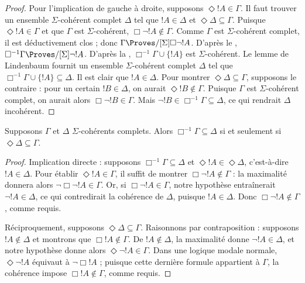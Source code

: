 \documentclass[../../../include/open-logic-section]{subfiles}
\begin{document}
{\begin{proof}
  Pour l'implication de gauche à droite, supposons $\Diamond !A \in
  \Gamma$. Il faut trouver un ensemble $\Sigma$-cohérent complet
  $\Delta$ tel que $!A \in \Delta$ et $\Diamond\Delta \subseteq \Gamma$.
  Puisque $\Diamond !A \in \Gamma$ et que $\Gamma$ est
  $\Sigma$-cohérent, $\Box\lnot !A \notin \Gamma$. Comme $\Gamma$ est
  $\Sigma$-cohérent complet, il est déductivement clos ; donc $\Gamma
  \Proves/[\Sigma] \Box\lnot !A$. D'après le ,
  $\Box^{-1}\Gamma \Proves/[\Sigma] \lnot !A$. D'après la
  ,
  $\Box^{-1}\Gamma \cup \{ !A \}$ est $\Sigma$-cohérent. Le lemme de
  Lindenbaum fournit un ensemble $\Sigma$-cohérent complet
  $\Delta$ tel que $\Box^{-1}\Gamma \cup \{ !A \} \subseteq
  \Delta$. Il est clair que $!A \in \Delta$. Pour montrer
  $\Diamond\Delta \subseteq \Gamma$, supposons le contraire : pour un
  certain $!B \in \Delta$, on aurait $\Diamond !B \notin \Gamma$.
  Puisque $\Gamma$ est $\Sigma$-cohérent complet, on aurait alors
  $\Box\lnot !B \in \Gamma$. Mais $\lnot
  !B \in \Box^{-1}\Gamma \subseteq \Delta$, ce qui rendrait $\Delta$
  incohérent.
\end{proof}
}

\begin{lem}
  Supposons $\Gamma$ et $\Delta$ $\Sigma$-cohérents complets. Alors
  $\Box^{-1}\Gamma \subseteq \Delta$ si et seulement si
  $\Diamond\Delta \subseteq \Gamma$.
\end{lem}

\begin{proof}
  Implication directe : supposons $\Box^{-1}\Gamma \subseteq \Delta$
  et $\Diamond!A \in \Diamond\Delta$, c'est-à-dire $!A \in \Delta$.
  Pour établir $\Diamond!A \in \Gamma$, il suffit de montrer
  $\Box\lnot!A \notin \Gamma$ : la maximalité donnera alors
  $\lnot\Box\lnot
  !A \in \Gamma$. Or, si $\Box\lnot!A \in \Gamma$, notre hypothèse
  entraînerait $\lnot!A \in \Delta$, ce qui contredirait la cohérence
  de $\Delta$, puisque $!A \in \Delta$. Donc $\Box\lnot!A \notin
  \Gamma$, comme requis.

  Réciproquement, supposons $\Diamond\Delta
  \subseteq \Gamma$. Raisonnons par contraposition : supposons $!A
  \notin \Delta$ et montrons que $\Box!A \notin \Gamma$. De $!A \notin
  \Delta$, la maximalité donne $\lnot!A \in \Delta$, et notre hypothèse
  donne alors $\Diamond\lnot!A \in \Gamma$. Dans une logique modale
  normale, $\Diamond\lnot!A$ équivaut à $\lnot\Box !A$ ; puisque cette
  dernière formule appartient à $\Gamma$, la cohérence impose
  $\Box!A \notin\Gamma$, comme requis.
\end{proof}
\end{document}
